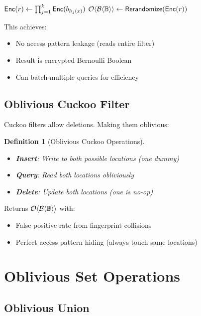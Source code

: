\documentclass[11pt,final]{article}
\newcommand{\BernBool}{\mathcal{B}\langle \Bool \rangle}
\newtheorem{definition}[theorem]{Definition}
\begin{document}
\begin{algorithm}[H]
\caption{Oblivious Encrypted Bloom Filter Query}
\KwOut{$\Obv{\BernBool}$}
$\mathsf{Enc}(r) \gets \prod_{j=1}^k \mathsf{Enc}(b_{h_j(x)})$ 
$\Obv{\BernBool} \gets \mathsf{Rerandomize}(\Enc{r})$\;
\Return{$\Obv{\BernBool}$}
\end{algorithm}

This achieves:
\begin{itemize}
    \item No access pattern leakage (reads entire filter)
    \item Result is encrypted Bernoulli Boolean
    \item Can batch multiple queries for efficiency
\end{itemize}

\subsection{Oblivious Cuckoo Filter}

Cuckoo filters allow deletions. Making them oblivious:

\begin{definition}[Oblivious Cuckoo Operations]
\begin{itemize}
    \item \textbf{Insert}: Write to both possible locations (one dummy)
    \item \textbf{Query}: Read both locations obliviously
    \item \textbf{Delete}: Update both locations (one is no-op)
\end{itemize}
\end{definition}

Returns $\Obv{\BernBool}$ with:
\begin{itemize}
    \item False positive rate from fingerprint collisions
    \item Perfect access pattern hiding (always touch same locations)
\end{itemize}

\section{Oblivious Set Operations}

\subsection{Oblivious Union}
\end{document}
